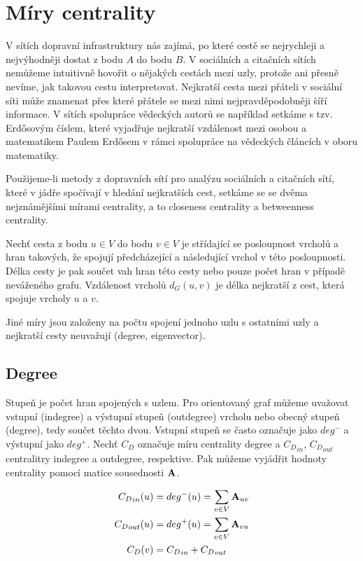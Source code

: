 \documentclass[12pt,titlepage]{report}
\begin{document}
\section{Míry centrality}
V sítích dopravní infrastruktury nás zajímá, po které cestě se nejrychleji a
nejvýhodněji dostat z bodu $A$ do bodu $B$. V sociálních a citačních sítích
nemůžeme intuitivně hovořit o nějakých cestách mezi uzly, protože ani přesně
nevíme, jak takovou cestu interpretovat. Nejkratší cesta mezi přáteli v
sociální síti může znamenat přes které přátele se mezi nimi nejpravděpodobněji
šíří informace. V sítích spolupráce vědeckých autorů se například setkáme s
tzv. Erdősovým číslem, které vyjadřuje nejkratší vzdálenost mezi osobou a
matematikem Paulem Erdősem v rámci spolupráce na vědeckých článcích v oboru
matematiky.

Použijeme-li metody z dopravních sítí pro analýzu sociálních a citačních sítí,
které v jádře spočívají v hledání nejkratších cest, setkáme se se dvěma
nejznámějšími mírami centrality, a to closeness centrality a betweenness
centrality.

Nechť cesta z bodu $u \in V$ do bodu $v \in V$ je střídající se posloupnost
vrcholů a hran takových, že spojují předcházející a následující vrchol v této
posloupnosti. Délka cesty je pak součet vah hran této cesty nebo pouze počet
hran v případě neváženého grafu. Vzdálenost vrcholů $d_G(u, v)$ je délka
nejkratší z cest, která spojuje vrcholy $u$ a $v$.

Jiné míry jsou založeny na počtu spojení jednoho uzlu s ostatními uzly a
nejkratší cesty neuvažují (degree, eigenvector).


\subsection{Degree}
Stupeň je počet hran spojených s uzlem. Pro orientovaný graf můžeme uvažovat
vstupní (indegree) a výstupní stupeň (outdegree) vrcholu nebo obecný stupeň
(degree), tedy součet těchto dvou. Vstupní stupeň se často označuje jako
$deg^-$ a výstupní jako $deg^+$. Nechť $C_D$ označuje míru centrality degree a
${C_D}_{in}$, ${C_D}_{out}$ centralitry indegree a outdegree, respektive. Pak
můžeme vyjádřit hodnoty centrality pomocí matice sousednosti ${\bf A}$.

\begin{align}
\label{eq:degree}
{C_D}_{in}(u) &= deg^-(u)  = \displaystyle\sum\limits_{v \in V} {\bf A}_{uv} \\
{C_D}_{out}(u) &= deg^+(u) = \displaystyle\sum\limits_{v \in V} {\bf A}_{vu} \\
{C_D}(v) &= {C_D}_{in} + {C_D}_{out}
\end{align}
\end{document}

